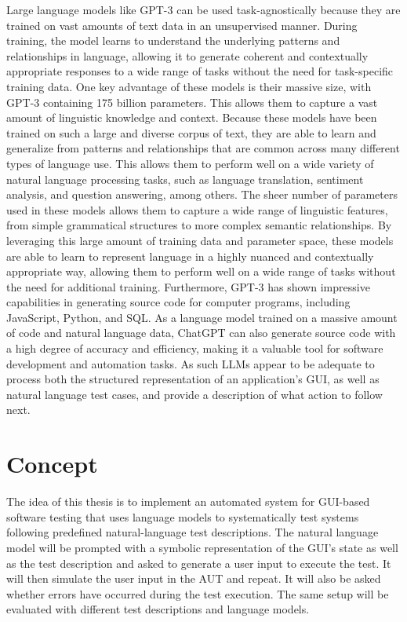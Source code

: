 Large language models like GPT-3 can be used task-agnostically because they are trained on vast amounts of text data in an unsupervised manner. During training, the model learns to understand the underlying patterns and relationships in language, allowing it to generate coherent and contextually appropriate responses to a wide range of tasks without the need for task-specific training data.
One key advantage of these models is their massive size, with GPT-3 containing 175 billion parameters.
This allows them to capture a vast amount of linguistic knowledge and context.
Because these models have been trained on such a large and diverse corpus of text, they are able to learn and generalize from patterns and relationships that are common across many different types of language use. This allows them to perform well on a wide variety of natural language processing tasks, such as language translation, sentiment analysis, and question answering, among others.
The sheer number of parameters used in these models allows them to capture a wide range of linguistic features, from simple grammatical structures to more complex semantic relationships. By leveraging this large amount of training data and parameter space, these models are able to learn to represent language in a highly nuanced and contextually appropriate way, allowing them to perform well on a wide range of tasks without the need for additional training.
Furthermore, GPT-3 has shown impressive capabilities in generating source code for computer programs, including JavaScript, Python, and SQL. As a language model trained on a massive amount of code and natural language data, ChatGPT can also generate source code with a high degree of accuracy and efficiency, making it a valuable tool for software development and automation tasks.
As such LLMs appear to be adequate to process both the structured representation of an application’s GUI, as well as natural language test cases, and provide a description of what action to follow next.


\chapter{Concept}

The idea of this thesis is to implement an automated system for GUI-based software testing that uses language models to systematically test systems following predefined natural-language test descriptions.
The natural language model will be prompted with a symbolic representation of the GUI’s state as well as the test description and asked to generate a user input to execute the test.
It will then simulate the user input in the AUT and repeat.
It will also be asked whether errors have occurred during the test execution.
The same setup will be evaluated with different test descriptions and language models.


